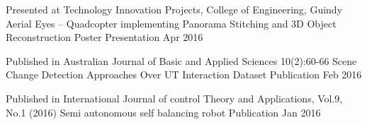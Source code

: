 

\begin{cventries}
  \cventry
    {Presented at Technology Innovation Projects, College of Engineering, Guindy} %
    {Aerial Eyes – Quadcopter implementing Panorama Stitching and 3D Object Reconstruction} %
    {Poster Presentation} %
    {Apr 2016} %
    {}


  \cventry
    {Published in Australian Journal of Basic and Applied Sciences 10(2):60-66} %
    {Scene Change Detection Approaches Over UT Interaction Dataset} %
    {Publication}
    {Feb 2016} %
    {}

  \cventry
    {Published in International Journal of control Theory and Applications, Vol.9, No.1 (2016)} %
    {Semi autonomous self balancing robot} %
    {Publication} %
    {Jan 2016} %
    {}

\end{cventries}
